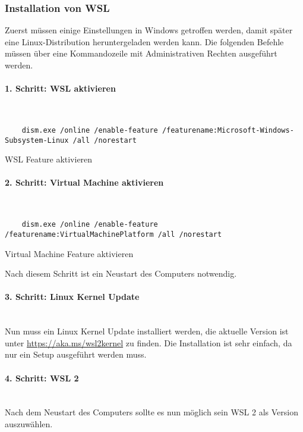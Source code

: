\subsubsection{Installation von WSL}
Zuerst müssen einige Einstellungen in Windows getroffen werden, damit später eine
Linux-Distribution heruntergeladen werden kann. Die folgenden Befehle müssen über eine
Kommandozeile mit Administrativen Rechten ausgeführt werden.


\paragraph{1. Schritt: WSL aktivieren}\mbox{}\\
\begin{listing}[H]
  \begin{verbatim}
    dism.exe /online /enable-feature /featurename:Microsoft-Windows-Subsystem-Linux /all /norestart
  \end{verbatim}
  \caption{WSL Feature aktivieren}
\end{listing}

\paragraph{2. Schritt: Virtual Machine aktivieren}\mbox{}\\
\begin{listing}[H]
  \begin{verbatim}
    dism.exe /online /enable-feature /featurename:VirtualMachinePlatform /all /norestart
  \end{verbatim}
  \caption{Virtual Machine Feature aktivieren}
\end{listing}

Nach diesem Schritt ist ein Neustart des Computers notwendig.

\paragraph{3. Schritt: Linux Kernel Update}\mbox{}\\
Nun muss ein Linux Kernel Update installiert werden, die aktuelle Version ist
unter \url{https://aka.ms/wsl2kernel} zu finden. Die Installation ist sehr
einfach, da nur ein Setup ausgeführt werden muss.

\paragraph{4. Schritt: WSL 2}\mbox{}\\
Nach dem Neustart des Computers sollte es nun möglich sein WSL 2 als Version
auszuwählen.

